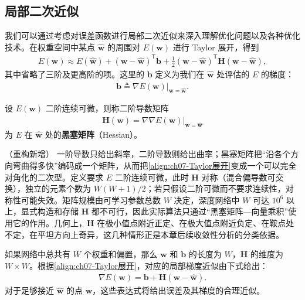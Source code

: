 \documentclass[../../main.tex]{subfiles}
\begin{document}
\subsection{局部二次近似}\label{subsection:ch07-局部二次近似}

我们可以通过考虑对误差函数进行局部二次近似来深入理解优化问题以及各种优化技术。在权重空间中某点 $\hat{\mathbf{w}}$ 的周围对 $E(\mathbf{w})$ 进行 Taylor 展开，得到
\begin{align}
E(\mathbf{w}) \approx E(\hat{\mathbf{w}})+(\mathbf{w}-\hat{\mathbf{w}})^{\mathsf T}\mathbf{b}+\frac{1}{2}(\mathbf{w}-\hat{\mathbf{w}})^{\mathsf T}\mathbf{H}(\mathbf{w}-\hat{\mathbf{w}}),
\label{align:ch07-Taylor展开}
\end{align}
其中省略了三阶及更高阶的项。这里的 $\mathbf{b}$ 定义为我们在 $\hat{\mathbf{w}}$ 处评估的 $E$ 的梯度：
\begin{align}
\mathbf{b} \triangleq \left.\nabla E(\mathbf{w})\right|_{\mathbf{w}=\hat{\mathbf{w}}}.
\label{align:ch07-梯度向量}
\end{align}

\begin{definition}[黑塞矩阵]\label{definition:ch07-黑塞矩阵}
设 $E(\mathbf{w})$ 二阶连续可微，则称二阶导数矩阵
\begin{align}
\mathbf{H}(\hat{\mathbf{w}}) = \left.\nabla\nabla E(\mathbf{w})\right|_{\mathbf{w}=\hat{\mathbf{w}}}
\label{align:ch07-黑塞矩阵}
\end{align}
为 $E$ 在 $\hat{\mathbf{w}}$ 处的\textbf{黑塞矩阵}（Hessian）。
\end{definition}

\begin{remark}（重构新增）
一阶导数只给出斜率，二阶导数则给出曲率；黑塞矩阵把“沿各个方向弯曲得多快”编码成一个矩阵，从而把\eqref{align:ch07-Taylor展开}变成一个可以完全对角化的二次型。定义要求 $E$ 二阶连续可微，此时 $\mathbf{H}$ 对称（混合偏导数可交换），独立的元素个数为 $W(W+1)/2$；若只假设二阶可微而不要求连续性，对称性可能失效。矩阵规模由可学习参数总数 $W$ 决定，深度网络中 $W$ 可达 $10^{6}$ 以上，显式构造和存储 $\mathbf{H}$ 都不可行，因此实际算法只通过“黑塞矩阵—向量乘积”使用它的作用。几何上，$\mathbf{H}$ 在极小值点附近正定、在极大值点附近负定、在鞍点处不定，在平坦方向上奇异，这几种情形正是本章后续收敛性分析的分类依据。
\end{remark}

如果网络中总共有 $W$ 个权重和偏置，那么 $\mathbf{w}$ 和 $\mathbf{b}$ 的长度为 $W$，$\mathbf{H}$ 的维度为 $W\times W$。根据\eqref{align:ch07-Taylor展开}，对应的局部梯度近似由下式给出：
\begin{align}
\nabla E(\mathbf{w}) = \mathbf{b}+\mathbf{H}(\mathbf{w}-\hat{\mathbf{w}}).
\label{align:ch07-梯度近似}
\end{align}
对于足够接近 $\hat{\mathbf{w}}$ 的点 $\mathbf{w}$，这些表达式将给出误差及其梯度的合理近似。
\end{document}
